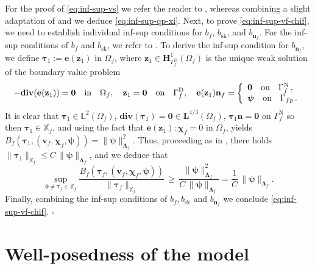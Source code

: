 \documentclass[11pt]{article}
\numberwithin{equation}{section}
\newcommand{\bLambda}{{\boldsymbol\Lambda}}
\newcommand{\bpsi}{{\boldsymbol\psi}}
\newcommand{\btau}{{\boldsymbol\tau}}
\newcommand{\bchi}{{\boldsymbol\chi}}
\newcommand{\bv}{{\mathbf{v}}}
\newcommand{\bz}{{\mathbf{z}}}
\newcommand{\bn}{{\mathbf{n}}}
\newcommand{\be}{{\mathbf{e}}}
\newcommand{\0}{{\mathbf{0}}}
\def\bz{\mathbf{z}}
\newcommand{\bL}{\mathbf{L}}
\newcommand\bH{\mathbf{H}}
\newcommand\bbX{\mathbb{X}}
\newcommand\bbL{\mathbb{L}}
\def\rD{\mathrm{D}}
\def\rN{\mathrm{N}}
\def\bdiv{\mathbf{div}}
\def\sk{\mathrm{sk}}
\def\qin{{\quad\hbox{in}\quad}}
\def\qon{{\quad\hbox{on}\quad}}
\newenvironment{proof}{\noindent{\it Proof.}}{\hfill$\square$}
\numberwithin{equation}{section}
\begin{document}
\begin{proof}
For the proof of \eqref{eq:inf-sup-vs} we refer the reader to \cite[Lemma ~4.1, eq. (4.1)]{aeny2019}, whereas combining a slight adaptation of \cite[Lemma ~3.6, eq. (3.5)]{gos2011} and \cite[Lemma ~3.8, eq. (3.10)]{gos2011} we deduce \eqref{eq:inf-sup-qp-xi}.
Next, to prove \eqref{eq:inf-sup-vf-chif}, we need to establish individual inf-sup conditions for $b_f$, $b_\sk$, and $b_{\bn_f}$. For the inf-sup conditions of $b_f$ and $b_\sk$, we refer to \cite[Lemma 3.5, eqs. (3.57) and (3.61)]{gobs2021}. To derive the inf-sup condition for $b_{\bn_f}$, we define $\btau_1 := \be(\bz_1)$ in $\Omega_f$, where $\bz_1 \in \bH^1_{\Gamma^{\rD}_f}(\Omega_f)$ is the unique weak solution of the boundary value problem
\begin{equation*}
-\bdiv(\be(\bz_1)) = \0 \qin \Omega_f,\quad 
\bz_1 = \0 \qon \Gamma^{\rD}_f,\quad 
\be(\bz_1)\bn_f = \left\{\begin{array}{l}
\0 \qon \Gamma^{\rN}_f\,, \\ 
\bpsi \qon \Gamma_{fp}\,.
\end{array} \right.
\end{equation*}
It is clear that $\btau_1\in \bbL^2(\Omega_f)$, $\bdiv(\btau_1) = \0\in \bL^{4/3}(\Omega_f)$, $\btau_1\bn = \0$ on $\Gamma^{\rN}_f$ so then $\btau_1\in \bbX_f$, and using the fact that $\be(\bz_1):\bchi_f = 0$ in $\Omega_f$, yields $B_f(\btau_1,(\bv_f,\bchi_f,\bpsi)) = \|\bpsi\|_{\bLambda_f}^2$. 
Thus, proceeding as in \cite[Section~2.4.3.2]{Gatica}, there holds $\|\btau_1\|_{\bbX_f} \leq C\,\|\bpsi\|_{\bLambda_f}$, and we deduce that
\begin{equation*}%
\sup_{\0 \neq \btau_f\in \bbX_f} \frac{B_f(\btau_f,(\bv_f,\bchi_f,\bpsi))}{\|\btau_f\|_{\bbX_f}} 
\,\geq\, \frac{\|\bpsi\|_{\bLambda_f}^2}{C\,\|\bpsi\|_{\bLambda_f}} = \frac{1}{C}\,\|\bpsi\|_{\bLambda_f}.
\end{equation*}
Finally, combining the inf-sup conditions of $b_f, b_\sk$ and $b_{\bn_f}$ we conclude \eqref{eq:inf-sup-vf-chif}.
\end{proof}


\section{Well-posedness of the model}\label{sec:well-posedness-model}
\end{document}
